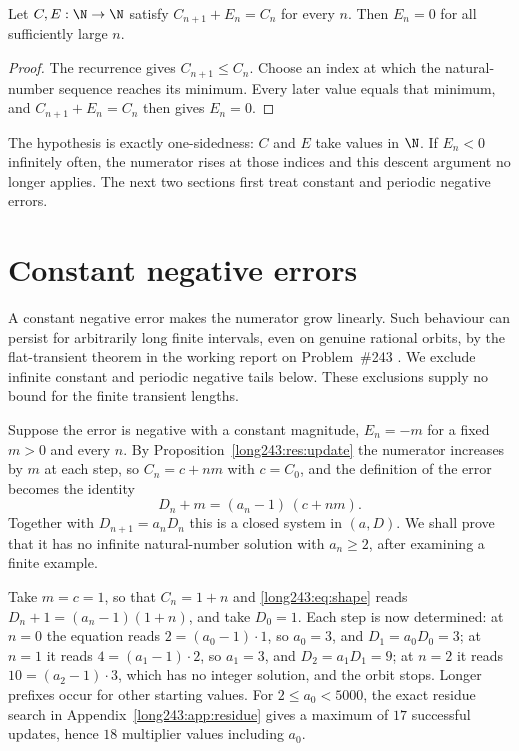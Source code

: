 \begin{theorem}[descent]\label{long243:res:descent}
Let $C,E:\N\to\N$ satisfy $C_{n+1}+E_n=C_n$ for every $n$.  Then $E_n=0$ for
all sufficiently large $n$.
\end{theorem}

\begin{proof}
The recurrence gives $C_{n+1}\le C_n$. Choose an index at which the
natural-number sequence reaches its minimum. Every later value equals
that minimum, and $C_{n+1}+E_n=C_n$ then gives $E_n=0$.
\end{proof}



The hypothesis is exactly one-sidedness: $C$ and $E$ take values in $\N$.  If
$E_n<0$ infinitely often, the numerator rises at those indices and this
descent argument no longer applies. The next two sections first treat
constant and periodic negative errors.

\section{Constant negative errors}\label{long243:sec:constant}

A constant negative error makes the numerator grow linearly.
Such behaviour can persist for arbitrarily long finite intervals, even
on genuine rational orbits, by the flat-transient theorem in the working
report on Problem~\#243
\cite[``Flat-transient theorem'']{erdosproblemaday243}. We exclude
infinite constant and periodic negative tails below. These exclusions
supply no bound for the finite transient lengths.

Suppose the error is negative with a constant magnitude, $E_n=-m$ for a fixed
$m>0$ and every $n$.  By
Proposition~\ref{long243:res:update} the numerator increases by $m$ at each step,
so $C_n=c+nm$ with $c=C_0$, and the definition of the error becomes the
identity
\[
 D_n+m=(a_n-1)\,(c+nm) .
\tag{5.1}\label{long243:eq:shape}
\]
Together with $D_{n+1}=a_nD_n$ this is a closed system in $(a,D)$.
We shall prove that it has no infinite natural-number solution with
$a_n\ge2$, after examining a finite example.

\begin{example}\label{long243:ex:shape}
Take $m=c=1$, so that $C_n=1+n$ and \eqref{long243:eq:shape} reads
$D_n+1=(a_n-1)(1+n)$, and take $D_0=1$.  Each step is now determined: at $n=0$
the equation reads $2=(a_0-1)\cdot1$, so $a_0=3$, and $D_1=a_0D_0=3$; at $n=1$
it reads $4=(a_1-1)\cdot2$, so $a_1=3$, and $D_2=a_1D_1=9$; at $n=2$ it reads
$10=(a_2-1)\cdot3$, which has no integer solution, and the orbit stops.
Longer prefixes occur for other starting values. For $2\le a_0<5000$,
the exact residue search in Appendix~\ref{long243:app:residue} gives a
maximum of $17$ successful updates, hence $18$ multiplier values
including $a_0$.
\end{example}

